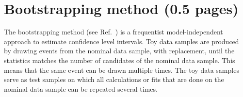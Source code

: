 
\section{Bootstrapping method (0.5 pages)}
\label{sec:dataanalysis:bootstrapping}

The bootstrapping method (see \eg Ref.~\cite{Behnke:2013pga}) is a frequentist
model-independent approach to estimate confidence level intervals. Toy data
samples are produced by drawing events from the nominal data sample, with
replacement, until the statistics matches the number of candidates of the
nominal data sample. This means that the same event can be drawn multiple
times. The toy data samples serve as test samples on which all calculations or
fits that are done on the nominal data sample can be repeated several times.
